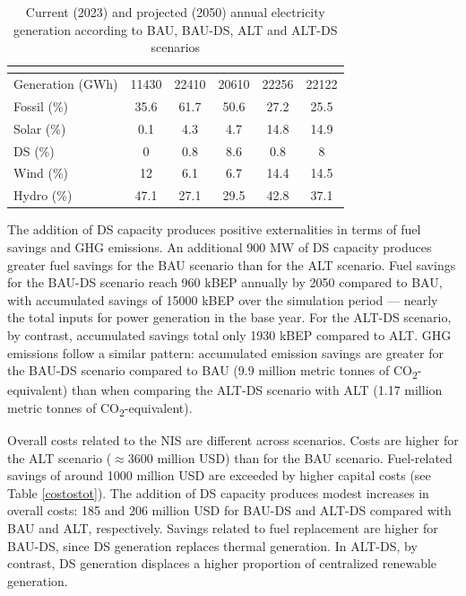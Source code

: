 \documentclass[a4paper,fleqn]{cas-dc}
\begin{document}
\begin{table}[!ht]
	\centering
	\small
	\setlength{\tabcolsep}{5pt}
	\caption{ Current (2023) and projected (2050) annual electricity generation according to BAU, BAU-DS, ALT and ALT-DS scenarios}
	\label{generation}
		\begin{tabular}{m{1.5cm}ccccc}
			\toprule
			\textbf{} & \text{current} & \text{BAU} & \text{BAU-DS} & \text{ALT} & \text{ALT-DS} \\
			\midrule
		    Generation (GWh) & 11430 & 22410 & 20610 & 22256 & 22122 \\
			Fossil (\%) & 35.6 & 61.7 & 50.6 & 27.2 & 25.5 \\
			Solar (\%) & 0.1  & 4.3 & 4.7 & 14.8 & 14.9 \\
			DS (\%) & 0 & 0.8  & 8.6 & 0.8 & 8 \\
			Wind (\%) & 12 & 6.1  & 6.7 & 14.4 & 14.5 \\
			Hydro (\%) & 47.1 & 27.1  & 29.5 & 42.8 & 37.1 \\
			\bottomrule
		\end{tabular}
	\end{table}


The addition of DS capacity produces positive externalities in terms of fuel savings and GHG emissions. An additional 900 MW of DS capacity produces greater fuel savings for the BAU scenario than for the ALT scenario. Fuel savings for the BAU-DS scenario reach 960 kBEP annually by 2050 compared to BAU, with accumulated savings of 15000 kBEP over the simulation period — nearly the total inputs for power generation in the base year. For the ALT-DS scenario, by contrast, accumulated savings total only 1930 kBEP compared to ALT. GHG emissions follow a similar pattern: accumulated emission savings are greater for the BAU-DS scenario compared to BAU (9.9 million metric tonnes of CO\textsubscript{2}-equivalent) than when comparing the ALT-DS scenario with ALT (1.17 million metric tonnes of CO\textsubscript{2}-equivalent).

Overall costs related to the NIS are different across scenarios. Costs are higher for the ALT scenario ($\approx$3600 million USD) than for the BAU scenario. Fuel-related savings of around 1000 million USD are exceeded by higher capital costs (see Table \ref{costostot}). The addition of DS capacity produces modest increases in overall costs: 185 and 206 million USD for BAU-DS and ALT-DS compared with BAU and ALT, respectively. Savings related to fuel replacement are higher for BAU-DS, since DS generation replaces thermal generation. In ALT-DS, by contrast, DS generation displaces a higher proportion of centralized renewable generation.
\end{document}
